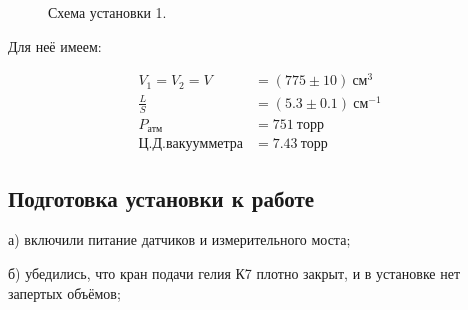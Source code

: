 \documentclass[a4paper, 12pt]{article}
\begin{document}
        \begin{figure}[ht]
            \caption{Схема установки 1.}
            \label{ustanovka}
        \end{figure}

        Для неё имеем:

        \begin{align*}
            V_1 = V_2 = V &= (775 \pm 10)~см^3\\
            \frac{L}{S} &= (5.3 \pm 0.1)~см^{-1}\\
            P_{атм} &= 751~торр\\
            Ц. Д. вакуумметра &= 7.43~торр
        \end{align*}

    \subsection{Подготовка установки к работе}
        а) включили питание датчиков и измерительного моста;

        б) убедились, что кран подачи гелия К7 плотно закрыт, и в установке нет
        запертых объёмов;
\end{document}
